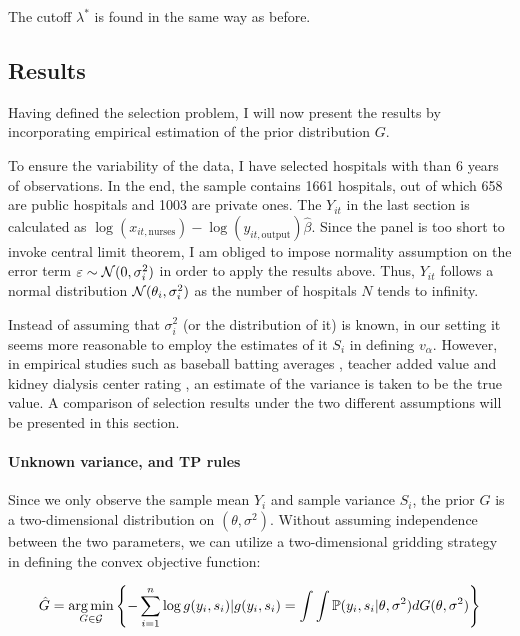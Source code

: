 \documentclass[12pt]{article}
\begin{document}
The cutoff $\lambda^*$ is found in the same way as before.

\subsection{Results}

Having defined the selection problem, I will now present the results by
incorporating empirical estimation of the prior distribution \( G \).

To ensure the variability of the data, I have selected hospitals with than 6
years of observations. In the end, the sample contains 1661 hospitals, out of
which 658 are public hospitals and 1003 are private ones. The $Y_{it}$ in the
last section is calculated as $ \log(x_{it,\text{nurses}}) -
    \log(y_{it,\text{output}})\hat{\beta}$. Since the panel is too short to invoke
central limit theorem, I am obliged to impose normality assumption on the error
term $\varepsilon \sim \mathcal{N}(0,\sigma_i^2)$ in order to apply the results
above. Thus, $Y_{it}$ follows a normal distribution
$\mathcal{N}(\theta_i,\sigma_i^2)$ as the number of hospitals $N$ tends to infinity.

Instead of assuming that $\sigma_i^2$ (or the distribution of it) is known, in
our setting it seems more reasonable to employ the estimates of it $S_i$ in
defining $v_\alpha$. However, in empirical studies such as baseball batting
averages \citep{gu2017empirical}, teacher added value \citep{gilraine2020new}
and kidney dialysis center rating \citep{gu2023invidious}, an estimate of the
variance is taken to be the true value. A comparison of selection results under
the two different assumptions will be presented in this section.

\paragraph{Unknown variance, and TP rules}

Since we only observe the sample mean $Y_i$ and sample variance $S_i$, the
prior $G$ is a two-dimensional distribution on $(\theta,\sigma^2)$. Without
assuming independence between the two parameters, we can utilize a
two-dimensional gridding strategy in defining the convex objective function:

\begin{equation*}
    \hat{G}=\operatorname*{arg\,min}_{G\in \mathcal{G}} \left\{-\sum_{i=1}^{n}\log g(y_i,s_i)|g(y_i,s_i)=\int \int  \mathbb{P}(y_i,s_i |\theta,\sigma^2)dG(\theta,\sigma^2) \right\}
\end{equation*}
\end{document}
